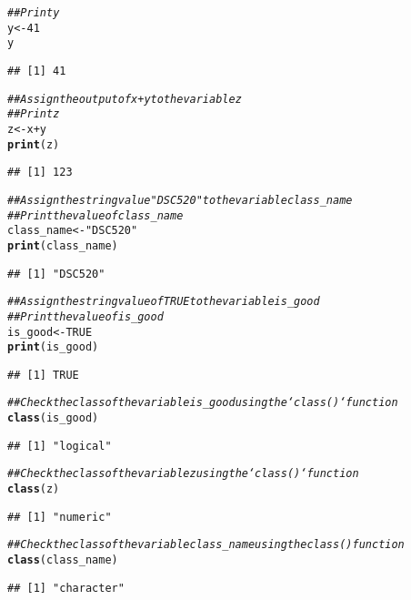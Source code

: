 \documentclass{article}\usepackage[]{graphicx}\usepackage[]{xcolor}
\makeatletter
\newcommand{\hlnum}[1]{\textcolor[rgb]{0.686,0.059,0.569}{#1}}%
\newcommand{\hlstr}[1]{\textcolor[rgb]{0.192,0.494,0.8}{#1}}%
\newcommand{\hlcom}[1]{\textcolor[rgb]{0.678,0.584,0.686}{\textit{#1}}}%
\newcommand{\hlopt}[1]{\textcolor[rgb]{0,0,0}{#1}}%
\newcommand{\hlstd}[1]{\textcolor[rgb]{0.345,0.345,0.345}{#1}}%
\newcommand{\hlkwb}[1]{\textcolor[rgb]{0.69,0.353,0.396}{#1}}%
\newcommand{\hlkwd}[1]{\textcolor[rgb]{0.737,0.353,0.396}{\textbf{#1}}}%
\newenvironment{kframe}{%
 \def\at@end@of@kframe{}%
 \ifinner\ifhmode%
  \def\at@end@of@kframe{\end{minipage}}%
  \begin{minipage}{\columnwidth}%
 \fi\fi%
 \def\FrameCommand##1{\hskip\@totalleftmargin \hskip-\fboxsep
 \colorbox{shadecolor}{##1}\hskip-\fboxsep
     \hskip-\linewidth \hskip-\@totalleftmargin \hskip\columnwidth}%
 \MakeFramed {\advance\hsize-\width
   \@totalleftmargin\z@ \linewidth\hsize
   \@setminipage}}%
 {\par\unskip\endMakeFramed%
 \at@end@of@kframe}
\newenvironment{knitrout}{}{} %
\makeatother
\begin{document}
\begin{knitrout}
\begin{kframe}
\begin{alltt}
\hlcom{## Print y}
\hlstd{y} \hlkwb{<-} \hlnum{41}
\hlstd{y}
\end{alltt}
\begin{verbatim}
## [1] 41
\end{verbatim}
\begin{alltt}
\hlcom{## Assign the output of x + y to the variable z}
\hlcom{## Print z}
\hlstd{z} \hlkwb{<-} \hlstd{x}\hlopt{+}\hlstd{y}
\hlkwd{print}\hlstd{(z)}
\end{alltt}
\begin{verbatim}
## [1] 123
\end{verbatim}
\begin{alltt}
\hlcom{## Assign the string value "DSC520" to the variable class_name}
\hlcom{## Print the value of class_name}
\hlstd{class_name} \hlkwb{<-} \hlstr{"DSC520"}
\hlkwd{print}\hlstd{(class_name)}
\end{alltt}
\begin{verbatim}
## [1] "DSC520"
\end{verbatim}
\begin{alltt}
\hlcom{## Assign the string value of TRUE to the variable is_good}
\hlcom{## Print the value of is_good}
\hlstd{is_good} \hlkwb{<-} \hlnum{TRUE}
\hlkwd{print}\hlstd{(is_good)}
\end{alltt}
\begin{verbatim}
## [1] TRUE
\end{verbatim}
\begin{alltt}
\hlcom{## Check the class of the variable is_good using the `class()` function}
\hlkwd{class}\hlstd{(is_good)}
\end{alltt}
\begin{verbatim}
## [1] "logical"
\end{verbatim}
\begin{alltt}
\hlcom{## Check the class of the variable z using the `class()` function}
\hlkwd{class}\hlstd{(z)}
\end{alltt}
\begin{verbatim}
## [1] "numeric"
\end{verbatim}
\begin{alltt}
\hlcom{## Check the class of the variable class_name using the class() function}
\hlkwd{class}\hlstd{(class_name)}
\end{alltt}
\begin{verbatim}
## [1] "character"
\end{verbatim}
\end{kframe}
\end{knitrout}
\end{document}
